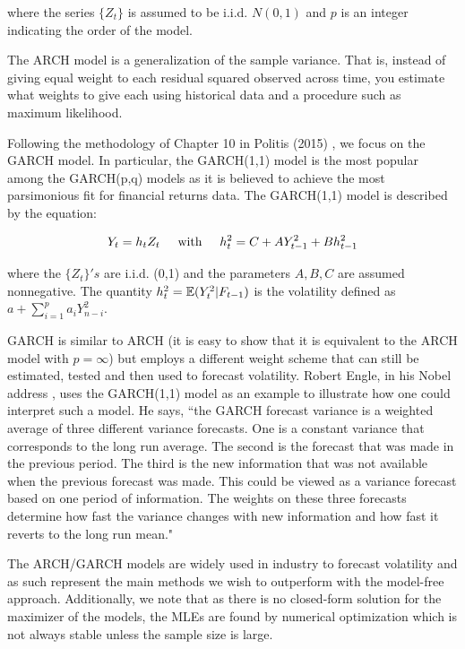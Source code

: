 \documentclass[11pt,]{article}
\begin{document}
where the series $\{Z_t\}$ is assumed to be i.i.d. $N(0,1)$ and $p$ is an integer indicating the order of the model.

The ARCH model is a generalization of the sample variance. That is, instead of giving equal weight to each residual squared observed across time, you estimate what weights to give each using historical data and a procedure such as maximum likelihood.

Following the methodology of Chapter 10 in Politis (2015) \cite{Politis2015}, we focus on the GARCH model. In particular, the GARCH(1,1) model is the most popular among the GARCH(p,q) models as it is believed to achieve the most parsimonious fit for financial returns data. The GARCH(1,1) model is described by the equation:

\begin{equation}
Y_t = h_t Z_t \hspace{0.5cm} \textnormal{with} \hspace{0.5cm} h_{t}^2 = C + AY_{t-1}^2 + Bh_{t-1}^2
\end{equation}

where the $\{Z_t\}'s$ are i.i.d. (0,1) and the parameters $A,B,C$ are assumed nonnegative. The quantity $h_{t}^2 = \mathbb{E}(Y_{t}^2|F_{t-1})$ is the volatility defined as $a + \sum_{i=1}^{p}a_iY_{n-i}^2$.

GARCH is similar to ARCH (it is easy to show that it is equivalent to the ARCH model with $p=\infty$) but employs a different weight scheme that can still be estimated, tested and then used to forecast volatility. Robert Engle, in his Nobel address \cite{EngleNobel}, uses the GARCH(1,1) model as an example to illustrate how one could interpret such a model. He says, ``the GARCH forecast variance is a weighted average of three different variance forecasts. One is a constant variance that corresponds to the long run average. The second is the forecast that was made in the previous period. The third is the new information that was not available when the previous forecast was made. This could be viewed as a variance forecast based on one period of information. The weights on these three forecasts determine how fast the variance changes with new information and how fast it reverts to the long run mean."

The ARCH/GARCH models are widely used in industry to forecast volatility and as such represent the main methods we wish to outperform with the model-free approach. Additionally, we note that as there is no closed-form solution for the maximizer of the models, the MLEs are found by numerical optimization which is not always stable unless the sample size is large.
\end{document}
